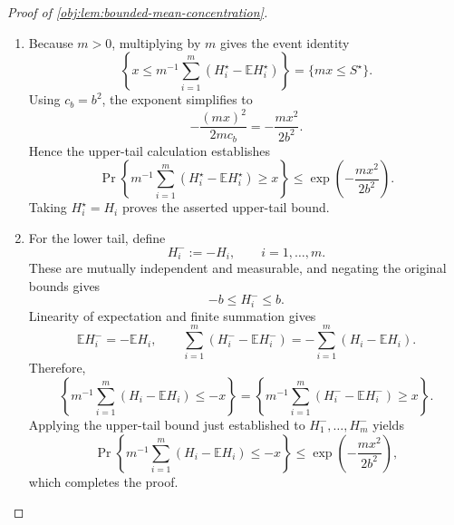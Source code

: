 \documentclass[11pt]{article}
\begin{document}
\begin{proof}[Proof of \cref{obj:lem:bounded-mean-concentration}]
\begin{enumerate}
\item
Because \(m>0\), multiplying by \(m\) gives the event identity
\[
\left\{
x\le m^{-1}\sum_{i=1}^m
(H_i^\star-\mathbb EH_i^\star)
\right\}
=
\{mx\le S^\star\}.
\]
Using \(c_b=b^2\), the exponent simplifies to
\[
-\frac{(mx)^2}{2mc_b}
=
-\frac{mx^2}{2b^2}.
\]
Hence the upper-tail calculation establishes
\[
\Pr\left\{
m^{-1}\sum_{i=1}^m(H_i^\star-\mathbb EH_i^\star)\ge x
\right\}
\le
\exp\left(-\frac{mx^2}{2b^2}\right).
\]
Taking \(H_i^\star=H_i\) proves the asserted upper-tail bound.

\item
For the lower tail, define
\[
H_i^-:=-H_i,
\qquad i=1,\ldots,m.
\]
These are mutually independent and measurable, and negating the original bounds gives
\[
-b\le H_i^-\le b.
\]
Linearity of expectation and finite summation gives
\[
\mathbb EH_i^-=-\mathbb EH_i,
\qquad
\sum_{i=1}^m(H_i^--\mathbb EH_i^-)
=
-\sum_{i=1}^m(H_i-\mathbb EH_i).
\]
Therefore,
\[
\left\{
m^{-1}\sum_{i=1}^m(H_i-\mathbb EH_i)\le-x
\right\}
=
\left\{
m^{-1}\sum_{i=1}^m(H_i^--\mathbb EH_i^-)\ge x
\right\}.
\]
Applying the upper-tail bound just established to \(H_1^-,\ldots,H_m^-\) yields
\[
\Pr\left\{
m^{-1}\sum_{i=1}^m(H_i-\mathbb EH_i)\le-x
\right\}
\le
\exp\left(-\frac{mx^2}{2b^2}\right),
\]
which completes the proof.
\end{enumerate}
\end{proof}
\end{document}
